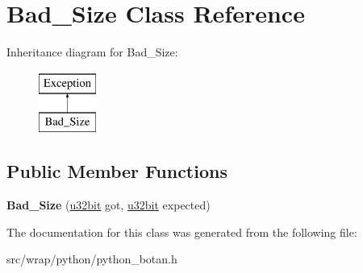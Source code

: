 \hypertarget{classBad__Size}{\section{Bad\-\_\-\-Size Class Reference}
\label{classBad__Size}
}
Inheritance diagram for Bad\-\_\-\-Size\-:\begin{figure}[H]
\begin{center}
\leavevmode
\includegraphics[height=2.000000cm]{classBad__Size}
\end{center}
\end{figure}
\subsection*{Public Member Functions}
\begin{DoxyCompactItemize}
\item 
\hypertarget{classBad__Size_ac51f0a2f54b6bb01b39650302e6c35c1}{{\bfseries Bad\-\_\-\-Size} (\hyperlink{namespaceBotan_aacc7d03c95e97e76168fc1c819031830}{u32bit} got, \hyperlink{namespaceBotan_aacc7d03c95e97e76168fc1c819031830}{u32bit} expected)}\label{classBad__Size_ac51f0a2f54b6bb01b39650302e6c35c1}

\end{DoxyCompactItemize}


The documentation for this class was generated from the following file\-:\begin{DoxyCompactItemize}
\item 
src/wrap/python/python\-\_\-botan.\-h\end{DoxyCompactItemize}
